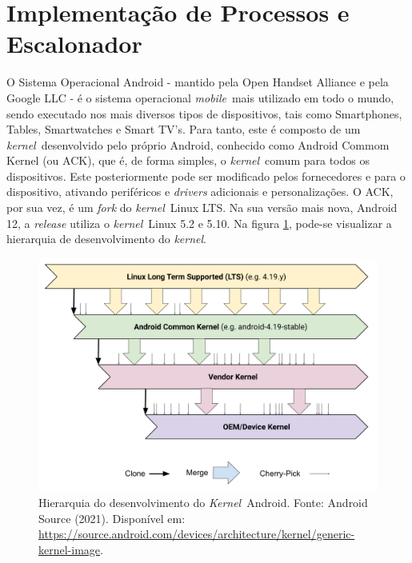 \documentclass[12pt, a4paper]{article}
\author{Wellington Espindula}
\date{Setembro de 2021}
\newcommand{\tit}[1]{\textit{#1}}
\newcommand{\kernel}{\tit{kernel}}
\newcommand{\Kernel}{\tit{Kernel}}
\newcommand{\mobile}{\tit{mobile}}
\begin{document}
    \maketitle
   
   \section{Implementação de Processos e Escalonador}
   O Sistema Operacional Android - mantido pela Open Handset Alliance e pela Google LLC - é o sistema operacional \mobile \ mais utilizado em todo o mundo, sendo executado nos mais diversos tipos de dispositivos, tais como Smartphones, Tables, Smartwatches e Smart TV's.\cite{wiki:android} Para tanto, este é composto de um \kernel \ desenvolvido pelo próprio Android, conhecido como Android Commom Kernel (ou ACK), que é, de forma simples, o \kernel \ comum para todos os dispositivos. Este posteriormente pode ser modificado pelos fornecedores e para o dispositivo, ativando periféricos e \tit{drivers} adicionais e personalizações. O ACK, por sua vez, é um \tit{fork} do \kernel \ Linux LTS. Na sua versão mais nova, Android 12, a \tit{release} utiliza o \kernel \ Linux 5.2 e 5.10.\cite{android:generic-kernel-image} Na figura \ref{fig:android-kernel-development}, pode-se visualizar a hierarquia de desenvolvimento do \kernel.
    \begin{figure}[!ht]
        \centering
        \includegraphics[width=\textwidth,height=0.30\textheight,keepaspectratio]{generic-kernel-image-overview.png}
        \caption{Hierarquia do desenvolvimento do \Kernel \ Android. Fonte: Android Source (2021). Disponível em: \url{https://source.android.com/devices/architecture/kernel/generic-kernel-image}.}
        \label{fig:android-kernel-development}
    \end{figure}
    
\end{document}
